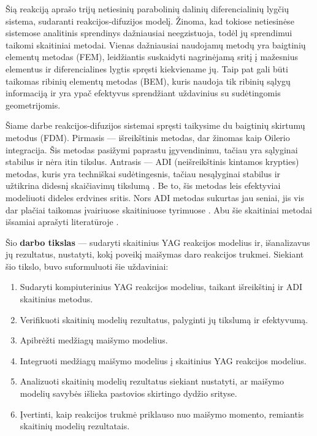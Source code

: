 Šią reakciją aprašo trijų netiesinių parabolinių dalinių diferencialinių lygčių sistema, sudaranti reakcijos-difuzijos modelį. Žinoma, kad tokiose netiesinėse sistemose analitinis sprendinys dažniausiai neegzistuoja, todėl jų sprendimui taikomi skaitiniai metodai. Vienas dažniausiai naudojamų metodų yra baigtinių elementų metodas (FEM), leidžiantis suskaidyti nagrinėjamą sritį į mažesnius elementus ir diferencialines lygtis spręsti kiekviename jų. Taip pat gali būti taikomas ribinių elementų metodas (BEM), kuris naudoja tik ribinių sąlygų informaciją ir yra ypač efektyvus sprendžiant uždavinius su sudėtingomis geometrijomis.

Šiame darbe reakcijos-difuzijos sistemai spręsti taikysime du baigtinių skirtumų metodus (FDM). Pirmasis — išreikštinis metodas, dar žinomas kaip Oilerio integracija. Šis metodas pasižymi paprastu įgyvendinimu, tačiau yra sąlyginai stabilus ir nėra itin tikslus. Antrasis — ADI (neišreikštinis kintamos krypties) metodas, kuris yra techniškai sudėtingesnis, tačiau nesąlyginai stabilus ir užtikrina didesnį skaičiavimų tikslumą \cite{doi:10.1137/0103003}. Be to, šis metodas leis efektyviai modeliuoti dideles erdvines sritis. Nors ADI metodas sukurtas jau seniai, jis vis dar plačiai taikomas įvairiuose skaitiniuose tyrimuose \cite{gaidamauskaiteComparisonFiniteDifference2007}. Abu šie skaitiniai metodai išsamiai aprašyti literatūroje \cite{pressNumericalRecipes3rd2007,levequeFiniteDifferenceMethods2007}.

Šio \textbf{darbo tikslas} — sudaryti skaitinius YAG reakcijos modelius ir, išanalizavus jų rezultatus, nustatyti, kokį poveikį maišymas daro reakcijos trukmei. Siekiant šio tikslo, buvo suformuluoti šie uždaviniai:

\begin{enumerate}
  \item Sudaryti kompiuterinius YAG reakcijos modelius, taikant išreikštinį ir ADI skaitinius metodus.
  \item Verifikuoti skaitinių modelių rezultatus, palyginti jų tikslumą ir efektyvumą.
  \item Apibrėžti medžiagų maišymo modelius.
  \item Integruoti medžiagų maišymo modelius į skaitinius YAG reakcijos modelius.
  \item Analizuoti skaitinių modelių rezultatus siekiant nustatyti, ar maišymo modelių savybės išlieka pastovios skirtingo dydžio srityse.
  \item Įvertinti, kaip reakcijos trukmė priklauso nuo maišymo momento, remiantis skaitinių modelių rezultatais.
\end{enumerate}
